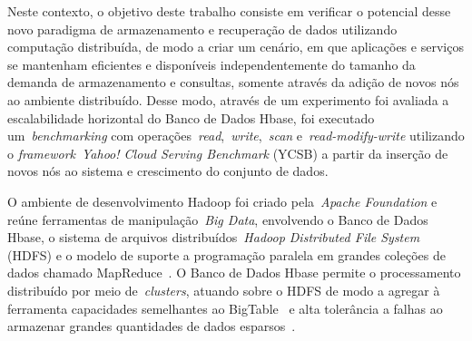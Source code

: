 \documentclass[12pt]{article}
\begin{document}


Neste contexto, o objetivo deste trabalho consiste em verificar o potencial desse novo paradigma de armazenamento e recuperação de dados utilizando computação distribuída, de modo a criar um cenário, em que aplicações e serviços se mantenham eficientes e disponíveis independentemente do tamanho da demanda de armazenamento e consultas, somente através da adição de novos nós ao ambiente distribuído. Desse modo, através de um experimento foi avaliada a escalabilidade horizontal do Banco de Dados Hbase, foi executado um~\emph{benchmarking} com operações~\emph{read},~\emph{write},~\emph{scan} e~\emph{read-modify-write} utilizando o \textit{framework}~\emph{Yahoo! Cloud Serving Benchmark} (YCSB) a partir da inserção de novos nós ao sistema e crescimento do conjunto de dados.

O ambiente de desenvolvimento Hadoop foi criado pela~\emph{Apache Foundation} e reúne ferramentas de manipulação~\emph{Big Data}, envolvendo o Banco de Dados Hbase, o sistema de arquivos distribuídos~\emph{Hadoop Distributed File System} (HDFS) e o modelo de suporte a programação paralela em grandes coleções de dados chamado MapReduce~\cite{hadoophbase}. O Banco de Dados Hbase permite o processamento distribuído por meio de~\emph{clusters}, atuando sobre o HDFS de modo a agregar à ferramenta capacidades semelhantes ao BigTable~\cite{chang2008bigtable} e alta tolerância a falhas ao armazenar grandes quantidades de dados esparsos~\cite{hadoophbase}.
\end{document}
